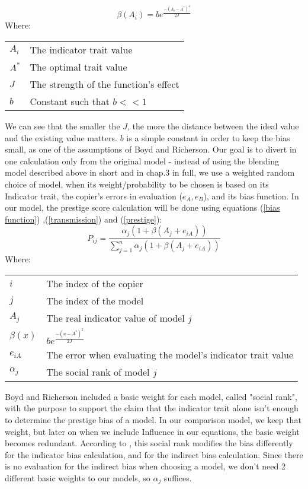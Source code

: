 \documentclass[11pt]{article}
\makeatletter
\newenvironment{conditions}
  {\par\vspace{\abovedisplayskip}\noindent\begin{tabular}{>{$}l<{$} @{${}={}$} l}}
  {\end{tabular}\par\vspace{\belowdisplayskip}}
\makeatother
\begin{document}
\begin{equation}\label{bias function}
	\beta(A_{i}) = be^{\frac{-(A_{i} - A^*)^2}{2J}}
\end{equation}
Where:
\begin{conditions}
A_{i} & The indicator trait value\\
A^* & The optimal trait value\\
J & The strength of the function's effect\\
b & Constant such that $b << 1$
\end{conditions}
We can see that the smaller the $J$, the more the distance between the ideal value and the existing value matters. $b$ is a simple constant in order to keep the bias small, as one of the assumptions of Boyd and Richerson. 
Our goal is to divert in one calculation only from the original model -  instead of using the blending model described above in short and in \cite{evolutionBook} chap.3 in full, we use a weighted random choice of model, when its weight/probability to be chosen is based on its Indicator trait, the copier's errors in evaluation ($e_{A},e_{B}$), and its bias function.
In our model, the prestige score calculation will be done using equations (\ref{bias function}) ,(\ref{transmission}) and (\ref{prestige}):
\begin{equation}\label{indicator only}
	P_{ij} =\frac{\alpha_j (1+\beta(A_{j} + e_{iA}))}{\sum\limits_{j=1}^{n} \alpha_j(1+\beta(A_{j} + e_{iA}))}
\end{equation}
Where:
\begin{conditions}
i & The index of the copier\\
j & The index of the model\\
A_j & The real indicator value of model $j$\\
\beta(x) & $be^{\frac{-(x - A^*)^2}{2J}}$\\
e_{iA} & The error when evaluating the model's indicator trait value \\
\alpha_j & The social rank of model $j$
\end{conditions}
Boyd and Richerson included a basic weight for each model, called "social rank", with the purpose to support the claim that the indicator trait alone isn't enough to determine the prestige bias of a model.
In our comparison model, we keep that weight, but later on when we include Influence in our equations, the basic weight becomes redundant. According to \cite{evolutionBook}, this social rank modifies the bias differently for the indicator bias calculation, and for the indirect bias calculation. Since there is no evaluation for the indirect bias when choosing a model, we don't need 2 different basic weights to our models, so $\alpha_j$ suffices.
\end{document}
